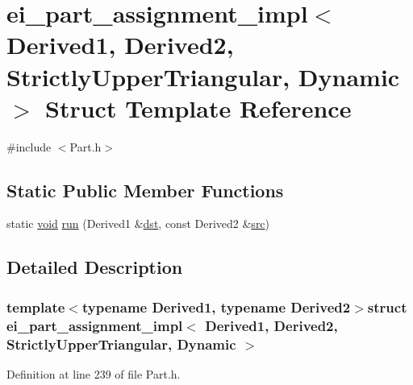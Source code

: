 \hypertarget{structei__part__assignment__impl_3_01_derived1_00_01_derived2_00_01_strictly_upper_triangular_00_01_dynamic_01_4}{\section{ei\-\_\-part\-\_\-assignment\-\_\-impl$<$ Derived1, Derived2, Strictly\-Upper\-Triangular, Dynamic $>$ Struct Template Reference}
\label{structei__part__assignment__impl_3_01_derived1_00_01_derived2_00_01_strictly_upper_triangular_00_01_dynamic_01_4}
}


{\ttfamily \#include $<$Part.\-h$>$}

\subsection*{Static Public Member Functions}
\begin{DoxyCompactItemize}
\item 
static \hyperlink{group___u_a_v_objects_plugin_ga444cf2ff3f0ecbe028adce838d373f5c}{void} \hyperlink{structei__part__assignment__impl_3_01_derived1_00_01_derived2_00_01_strictly_upper_triangular_00_01_dynamic_01_4_a679397156d64879fdf87ab907f9636d3}{run} (Derived1 \&\hyperlink{glext_8h_a92034251bfd455d524a9b5610cddba00}{dst}, const Derived2 \&\hyperlink{glext_8h_a72e0fdf0f845ded60b1fada9e9195cd7}{src})
\end{DoxyCompactItemize}


\subsection{Detailed Description}
\subsubsection*{template$<$typename Derived1, typename Derived2$>$struct ei\-\_\-part\-\_\-assignment\-\_\-impl$<$ Derived1, Derived2, Strictly\-Upper\-Triangular, Dynamic $>$}



Definition at line 239 of file Part.\-h.




